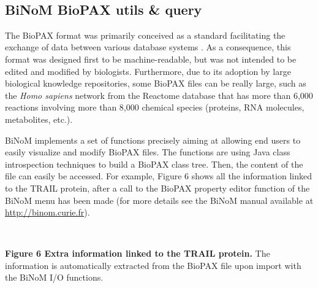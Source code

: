\documentclass[11pt]{bmc_article_s50}
\newenvironment{bmcformat}{\begin{raggedright}\baselineskip20pt\sloppy\setboolean{publ}{false}}{\end{raggedright}\baselineskip20pt\sloppy}
\begin{document}
\begin{bmcformat}
\vspace*{-21pt}

\hrulefill\




\subsection*{BiNoM BioPAX utils \& query}
The BioPAX format was primarily conceived as a standard facilitating the
exchange of data between various database systems \cite{demir2010biopax}. As a
consequence, this format was designed first to be machine-readable, but was not
intended
to be edited and modified by biologists. Furthermore, due to its adoption by
large biological knowledge repositories, some BioPAX files can be really large,
such as the \textit{Homo sapiens} network from the Reactome database
\cite{joshi2005reactome} that has more than 6,000 reactions involving more than
8,000 chemical species (proteins, RNA molecules, metabolites, etc.).

BiNoM implements a set of functions precisely aiming at allowing end users to
easily visualize and modify BioPAX files. The functions are using
Java class introspection techniques to build a BioPAX class tree. Then, the
content of the file can easily be accessed. For example, Figure 6 shows
all the information linked to the TRAIL protein, after a call to the
BioPAX property
editor function of the BiNoM menu has been made (for more details see the BiNoM manual available at \url{http://binom.curie.fr}).

\hrulefill\

\vspace*{-15pt}
\textbf{Figure 6 Extra information linked to the TRAIL protein.}
The information is automatically extracted from the BioPAX file upon
import with the BiNoM I/O functions.


\end{bmcformat}
\end{document}
